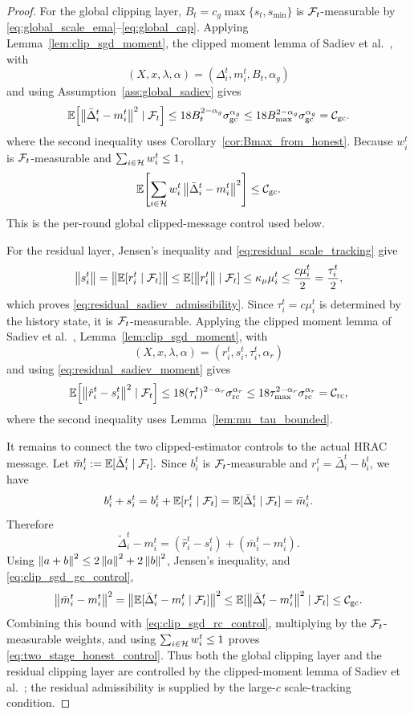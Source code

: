 \begin{proof}
For the global clipping layer, \(B_t=c_g\max\{s_t,s_{\min}\}\) is
\(\mathcal{F}_t\)-measurable by
\eqref{eq:global_scale_ema}--\eqref{eq:global_cap}. Applying
Lemma~\ref{lem:clip_sgd_moment}, the clipped moment lemma of
Sadiev et al.~\cite[Lemma~5.1]{sadiev2023highprob}, with
\[
    (X,x,\lambda,\alpha)
    =
    (\Delta_i^t,m_i^t,B_t,\alpha_g)
\]
and using Assumption~\ref{ass:global_sadiev} gives
\[
    \mathbb{E}\!\left[\left\lVert \bar\Delta_i^t-m_i^t \right\rVert^2\mid\mathcal{F}_t\right]
    \le
    18B_t^{2-\alpha_g}\sigma_{\mathrm{gc}}^{\alpha_g}
    \le
    18B_{\max}^{2-\alpha_g}\sigma_{\mathrm{gc}}^{\alpha_g}
    =
    \mathcal C_{\mathrm{gc}}.
\]
where the second inequality uses Corollary~\ref{cor:Bmax_from_honest}.
Because \(w_i^t\) is \(\mathcal{F}_t\)-measurable and \(\sum_{i\in\mathcal{H}}w_i^t\le1\),
\[
    \mathbb{E}\!\left[
        \sum_{i\in\mathcal{H}}w_i^t
        \left\lVert \bar\Delta_i^t-m_i^t \right\rVert^2
    \right]
    \le \mathcal C_{\mathrm{gc}}.
\]
This is the per-round global clipped-message control used below.

For the residual layer, Jensen's inequality and
\eqref{eq:residual_scale_tracking} give
\[
    \left\lVert s_i^t \right\rVert
    =
    \left\lVert \mathbb{E}[r_i^t\mid\mathcal{F}_t] \right\rVert
    \le
    \mathbb{E}[\left\lVert r_i^t \right\rVert\mid\mathcal{F}_t]
    \le
    \kappa_\mu\mu_i^t
    \le
    \frac{c\mu_i^t}{2}
    =
    \frac{\tau_i^t}{2},
\]
which proves \eqref{eq:residual_sadiev_admissibility}. Since
\(\tau_i^t=c\mu_i^t\) is determined by the history state, it is
\(\mathcal{F}_t\)-measurable. Applying the clipped
moment lemma of Sadiev et al.~\cite[Lemma~5.1]{sadiev2023highprob},
Lemma~\ref{lem:clip_sgd_moment}, with
\[
    (X,x,\lambda,\alpha)
    =
    (r_i^t,s_i^t,\tau_i^t,\alpha_r)
\]
and using \eqref{eq:residual_sadiev_moment} gives
\[
    \mathbb{E}\!\left[\left\lVert \hat r_i^t-s_i^t \right\rVert^2\mid\mathcal{F}_t\right]
    \le
    18(\tau_i^t)^{2-\alpha_r}\sigma_{\mathrm{rc}}^{\alpha_r}
    \le
    18\tau_{\max}^{2-\alpha_r}\sigma_{\mathrm{rc}}^{\alpha_r}
    =
    \mathcal C_{\mathrm{rc}},
\]
where the second inequality uses Lemma~\ref{lem:mu_tau_bounded}.

It remains to connect the two clipped-estimator controls to the actual HRAC
message. Let
\(
    \bar m_i^t:=\mathbb{E}[\bar\Delta_i^t\mid\mathcal{F}_t].
\)
Since \(b_i^t\) is \(\mathcal{F}_t\)-measurable and
\(r_i^t=\bar\Delta_i^t-b_i^t\), we have
\[
    b_i^t+s_i^t
    =
    b_i^t+\mathbb{E}[r_i^t\mid\mathcal{F}_t]
    =
    \mathbb{E}[\bar\Delta_i^t\mid\mathcal{F}_t]
    =
    \bar m_i^t.
\]
Therefore
\[
    \tilde\Delta_i^t-m_i^t
    =
    (\hat r_i^t-s_i^t)+(\bar m_i^t-m_i^t).
\]
Using \(\left\lVert a+b \right\rVert^2\le2\left\lVert a \right\rVert^2+2\left\lVert b \right\rVert^2\), Jensen's inequality, and
\eqref{eq:clip_sgd_gc_control},
\[
    \left\lVert \bar m_i^t-m_i^t \right\rVert^2
    =
    \left\lVert \mathbb{E}[\bar\Delta_i^t-m_i^t\mid\mathcal{F}_t] \right\rVert^2
    \le
    \mathbb{E}[\left\lVert \bar\Delta_i^t-m_i^t \right\rVert^2\mid\mathcal{F}_t]
    \le
    \mathcal C_{\mathrm{gc}}.
\]
Combining this bound with \eqref{eq:clip_sgd_rc_control}, multiplying by the
\(\mathcal{F}_t\)-measurable weights, and using \(\sum_{i\in\mathcal{H}}w_i^t\le1\) proves
\eqref{eq:two_stage_honest_control}. Thus both the global clipping layer and
the residual clipping layer are controlled by the clipped-moment lemma of
Sadiev et al.~\cite[Lemma~5.1]{sadiev2023highprob}; the residual admissibility is
supplied by the large-\(c\) scale-tracking condition.
\end{proof}


